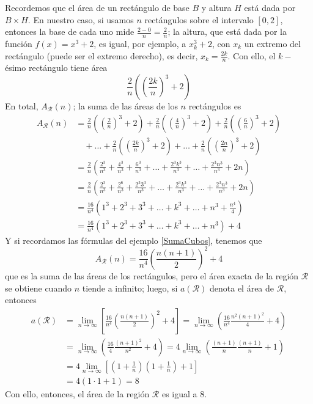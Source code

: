 Recordemos que el área de un rectángulo de base {\small $B$} y altura {\small $H$} está dada por {\small $B\times H$}. En nuestro caso, si usamos $n$ rectángulos sobre el intervalo $[0,2]$, entonces la base de cada uno mide $\frac{2-0}{n}=\frac{2}{n}$; la altura, que está dada por la función $f(x)=x^3+2$, es igual, por ejemplo, a $x_k^3+2$, con $x_k$ un extremo del rectángulo (puede ser el extremo derecho), es decir, $x_k=\frac{2k}{n}$. Con ello, el $k-$ésimo rectángulo tiene área
{\small
\[
\frac{2}{n} \left( \left(\frac{2k}{n}\right)^3+2 \right)
\]
}
En total, $A_\mathcal{R}(n)$; la suma de las áreas de los $n$ rectángulos es
\begin{align*}
A_\mathcal{R}(n)&=\frac{2}{n}\left( \left( \frac{2}{n}\right)^{3}+2\right) +\frac{2}{n}\left( \left( \frac{4}{n}\right)^{3}+2\right)+\frac{2}{n}\left(\left( \frac{6}{n}\right) ^{3}+2\right) \\
&\quad +\ldots+\frac{2}{n}\left(\left(\frac{2k}{n}\right)^{3}+2\right)+\ldots +\frac{2}{n}\left( \left( \frac{2n}{n}\right) ^{3}+2\right)\\
&=\frac{2}{n}\left(\frac{2^{3}}{n^{3}}+\frac{4^{3}}{n^{3}}+\frac{6^{3}}{n^{3}}
+\ldots+\frac{2^{3}k^{3}}{n^{3}}+\ldots+\frac{2^{3}n^{3}}{n^{3}}+2n\right)\\
&=\frac{2}{n}\left(\frac{2^{3}}{n^{3}}+\frac{2^{6}}{n^{3}}+\frac{2^{3}3^{3}}{n^{3}}
+\ldots+\frac{2^{3}k^{3}}{n^{3}}+\ldots+\frac{2^{3}n^{3}}{n^{3}}+2n\right)\\
&=\frac{16}{n^{4}}\left( 1^{3}+2^{3}+3^{3}+\ldots +k^{3}+\ldots +n^{3}+\frac{n^{4}}{4}\right)\\
&=\frac{16}{n^{4}}\left( 1^{3}+2^{3}+3^{3}+\ldots +k^{3}+\ldots
+n^{3}\right) +4
\end{align*}
Y si recordamos las fórmulas del ejemplo \ref{SumaCubos}, tenemos que
\[
A_\mathcal{R}(n)=\frac{16}{n^{4}}\left(\frac{n(n+1)}{2}\right)^2 +4
\]
que es la suma de las áreas de los rectángulos, pero el área exacta de la región $\mathcal{R}$ se obtiene cuando $n$ tiende a infinito; luego, si $a\left( \mathcal{R}\right) $ denota el área de $\mathcal{R}$, entonces
\begin{align*}
a\left( \mathcal{R}\right)& =\underset{n\rightarrow \infty }{\lim }\left[ \frac{16}{n^{4}}\left(\frac{n(n+1)}{2}\right)^2 +4\right]%
=\underset{n\rightarrow\infty }{\lim}\left(\frac{16}{n^{4}}\frac{n^{2}\left( n+1\right) ^{2}}{4} +4\right)\\
&=\underset{n\rightarrow \infty }{\lim }\left( \frac{16}{4}\frac{
\left( n+1\right) ^{2}}{n^{2}} +4\right)
=4\underset{n\rightarrow \infty }{\lim }\left( \frac{\left( n+1\right) }{n}\frac{\left( n+1\right) }{n}+1\right)\\
&=4\underset{n\rightarrow \infty }{\lim }\left[ \left( 1+\frac{1}{n}\right) \left( 1+\frac{1}{n}\right) +1\right]\\
&=4( 1\cdot 1+1)=8
\end{align*}
Con ello, entonces, el área de la región $\mathcal{R}$ es igual a $8$. 



